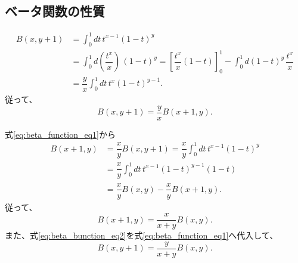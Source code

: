 \subsection{ベータ関数の性質}
\begin{align*}
 B(x,y+1)&=\int_0^1dt\,t^{x-1}(1-t)^y\\
&=\int_0^1d\left(\dfrac{t^x}{x}\right)\,(1-t)^y=\left[\dfrac{t^x}{x}(1-t)\right]_0^1-\int_0^1d(1-t)^y\,\dfrac{t^x}{x}\\
&=\dfrac{y}{x}\int_0^1dt\,t^x(1-t)^{y-1}.
\end{align*}
従って、
\begin{equation}
 B(x,y+1)=\dfrac{y}{x}B(x+1,y).\label{eq:beta_function_eq1}
\end{equation}

式\eqref{eq:beta_function_eq1}から
\begin{align*}
 B(x+1,y)&=\dfrac{x}{y}B(x,y+1)=\dfrac{x}{y}\int_0^1dt\,t^{x-1}(1-t)^y\\
&=\dfrac{x}{y}\int_0^1dt\,t^{x-1}(1-t)^{y-1}(1-t)\\
&=\dfrac{x}{y}B(x,y)-\dfrac{x}{y}B(x+1,y).
\end{align*}
従って、
\begin{equation}
 B(x+1,y)=\dfrac{x}{x+y}B(x,y).\label{eq:beta_bunction_eq2}
\end{equation}
また、式\eqref{eq:beta_bunction_eq2}を式\eqref{eq:beta_function_eq1}へ代入して、
\begin{equation}
 B(x,y+1)=\dfrac{y}{x+y}B(x,y).
\end{equation}

